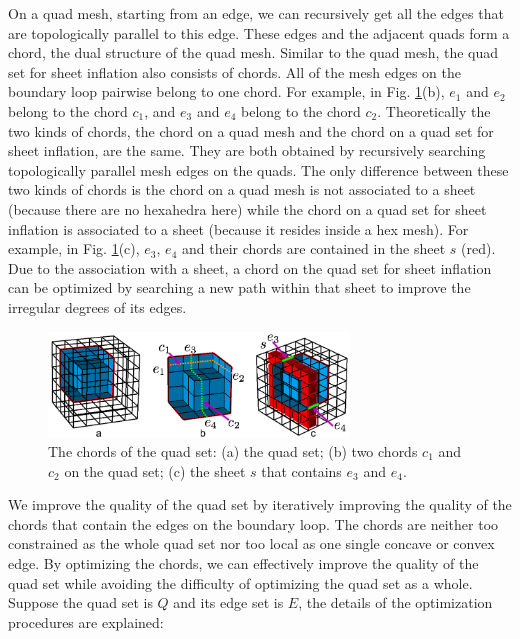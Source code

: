\documentclass[final,5p,times,twocolumn]{elsarticle}
\begin{document}
On a quad mesh, starting from an edge, we can recursively get all the edges that are topologically parallel to this edge. These edges and the adjacent quads form a chord, the dual structure of the quad mesh\cite{Murdoch:1997fy,Mitchell1996}. Similar to the quad mesh, the quad set for sheet inflation also consists of chords. All of the mesh edges on the boundary loop pairwise belong to one chord. For example, in Fig. \ref{fig:qs_dual}(b), $e_1$ and $e_2$ belong to the chord $c_1$, and $e_3$ and $e_4$ belong to the chord $c_2$. Theoretically the two kinds of chords, the chord on a quad mesh and the chord on a quad set for sheet inflation, are the same. They are both obtained by recursively searching topologically parallel mesh edges on the quads. The only difference between these two kinds of chords is the chord on a quad mesh is not associated to a sheet (because there are no hexahedra here) while the chord on a quad set for sheet inflation is associated to a sheet (because it resides inside a hex mesh). For example, in Fig. \ref{fig:qs_dual}(c), $e_3$, $e_4$ and their chords are contained in the sheet $s$ (red). Due to the association with a sheet, a chord on the quad set for sheet inflation can be optimized by searching a new path within that sheet to improve the irregular degrees of its edges.

\begin{figure}[htbp]
\begin{center}
\includegraphics[width=8cm]{qs_dual.png}
\caption{The chords of the quad set: (a) the quad set; (b) two chords $c_1$ and $c_2$ on the quad set; (c) the sheet $s$ that contains $e_3$ and $e_4$.}
\label{fig:qs_dual}
\end{center}
\end{figure}

We improve the quality of the quad set by iteratively improving the quality of the chords that contain the edges on the boundary loop. The chords are neither too constrained as the whole quad set nor too local as one single concave or convex edge. By optimizing the chords, we can effectively improve the quality of the quad set while avoiding the difficulty of optimizing the quad set as a whole. Suppose the quad set is $Q$ and its edge set is $E$, the details of the optimization procedures are explained:
\end{document}
